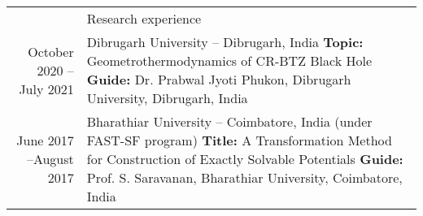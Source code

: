 \documentclass[a4paper, 11pt]{article}
\newcommand{\headingfont}{\Large\color{Bittersweet}}
\newenvironment{SectionTable}[1]{
	\renewcommand*{\arraystretch}{1.7}
	\setlength{\tabcolsep}{10pt}
	\begin{longtable}{Rp{5.2in}} & #1 \\}
{\end{longtable}\vspace{-.3cm}}
\begin{document}







\begin{SectionTable}{\headingfont Research experience}

October 2020 --July 2021 &
Dibrugarh University -- Dibrugarh, India \newline
\textbf{Topic:} Geometrothermodynamics of CR-BTZ Black Hole \newline
\textbf{Guide:} Dr. Prabwal Jyoti Phukon, Dibrugarh University, Dibrugarh, India  \\

June 2017 --August 2017 &
Bharathiar University -- Coimbatore, India (under FAST-SF program) \newline
\textbf{Title:} A Transformation Method for Construction of Exactly Solvable Potentials \newline
\textbf{Guide:} Prof. S. Saravanan, Bharathiar University, Coimbatore, India
\\
\end{SectionTable}













\end{document}
